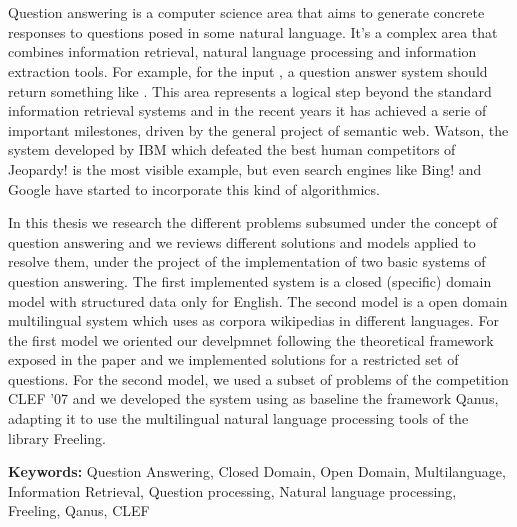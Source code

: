 \chapter*{\runtitle}
Question answering is a computer science area that aims to generate concrete responses to questions posed in some natural language. It's a complex area that combines information retrieval, natural language processing and information extraction tools. For example, for the input \textit{}, a question answer system should return something like .
This area represents a logical step beyond the standard information retrieval systems and in the recent years it has achieved a serie of important milestones, driven by the general project of semantic web. Watson, the system developed by IBM which defeated the best human competitors of Jeopardy! is the most visible example, but even search engines like Bing! and Google have started to incorporate this kind of algorithmics.

In this thesis we research the different problems subsumed under the concept of question answering and we reviews different solutions and models applied to resolve them, under the project of the implementation of two basic systems of question answering. The first implemented system is a closed (specific) domain model with structured data only for English. The second model is a open domain multilingual system which uses as corpora wikipedias in different languages. For the first model we oriented our develpmnet following the theoretical framework exposed in the paper \cite{QADB1} and we implemented solutions for a restricted set of questions. For the second model, we used a subset of problems of the competition CLEF '07 and we developed the system using as baseline the framework Qanus, adapting it to use the multilingual natural language processing tools of the library Freeling.
\bigskip

\noindent\textbf{Keywords:} Question Answering, Closed Domain, Open Domain, Multilanguage, Information Retrieval, Question processing, Natural language processing, Freeling, Qanus, CLEF